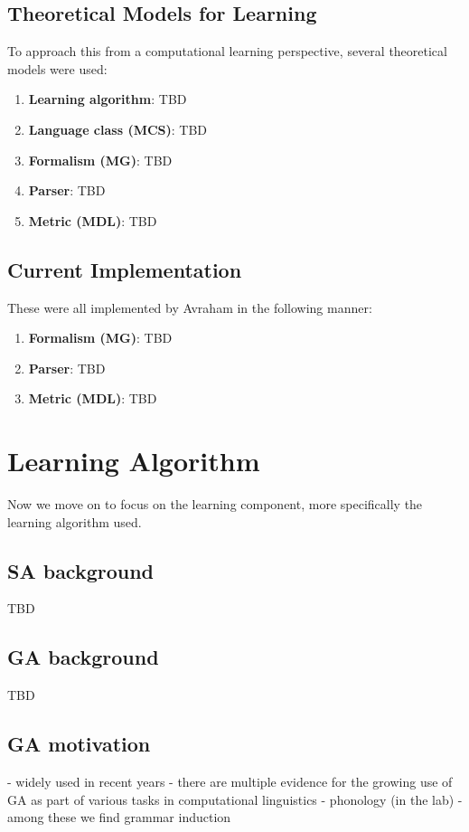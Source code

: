 \documentclass{article}
\begin{document}
\subsection{Theoretical Models for Learning} %
To approach this from a computational learning perspective, several theoretical models were used:
\begin{enumerate}
  \item \textbf{Learning algorithm}: TBD
  \item \textbf{Language class (MCS)}: TBD
  \item \textbf{Formalism (MG)}: TBD
  \item \textbf{Parser}: TBD
  \item \textbf{Metric (MDL)}: TBD
\end{enumerate}

\subsection{Current Implementation} 
These were all implemented by Avraham in the following manner:
\begin{enumerate}
  \item \textbf{Formalism (MG)}: TBD
  \item \textbf{Parser}: TBD
  \item \textbf{Metric (MDL)}: TBD
\end{enumerate}

\clearpage
\section{Learning Algorithm} 
Now we move on to focus on the learning component, more specifically the learning algorithm used.

\subsection{SA background} %
TBD
\subsection{GA background} %
TBD
\subsection{GA motivation} %
- widely used in recent years
- there are multiple evidence for the growing use of GA as part of various tasks in computational linguistics
- phonology (in the lab)
- among these we find grammar induction
\end{document}
